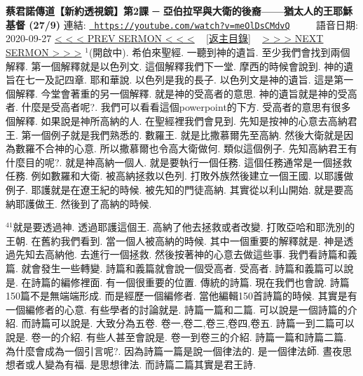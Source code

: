 \documentclass{book}
\begin{document}
\section{}
\label{sec:meOlDsCMdvQ}
\textbf{蔡君諾傳道【新約透視鏡】第2課 ─ 亞伯拉罕與大衛的後裔——猶太人的王耶穌基督 (27/9)}
\newline
\newline
連結: \href{https://youtube.com/watch?v=meOlDsCMdvQ}{\texttt{ https://youtube.com/watch?v=meOlDsCMdvQ}} ~~~~ 語音日期: 2020-09-27 
\newline
\newline
\hyperref[sec:6Yg3FVlhsxs]{\small{< < < PREV SERMON < < <}}
~
\hyperref[sec:index]{\small{[返主目錄]}}
~
\hyperref[sec:FpXj_b1Te98]{\small{> > > NEXT SERMON > > >}}
\newline
\newline
$^{1}$(開啟中).
希伯來聖經.
一聽到神的遺旨.
至少我們會找到兩個解釋.
第一個解釋就是以色列文.
這個解釋我們下一堂.
摩西的時候會說到.
神的遺旨在七一及記四章.
耶和華說.
以色列是我的長子.
以色列文是神的遺旨.
這是第一個解釋.
今堂會著重的另一個解釋.
就是神的受高者的意思.
神的遺旨就是神的受高者.
什麼是受高者呢?.
我們可以看看這個powerpoint的下方.
受高者的意思有很多個解釋.
如果說是神所高納的人.
在聖經裡我們會見到.
先知是按神的心意去高納君王.
第一個例子就是我們熟悉的.
數羅王.
就是比撒慕爾先至高納.
然後大衛就是因為數羅不合神的心意.
所以撒慕爾也令高大衛做何.
類似這個例子.
先知高納君王有什麼目的呢?.
就是神高納一個人.
就是要執行一個任務.
這個任務通常是一個拯救任務.
例如數羅和大衛.
被高納拯救以色列.
打敗外族然後建立一個王國.
以耶護做例子.
耶護就是在遼王紀的時候.
被先知的門徒高納.
其實從以利山開始.
就是要高納耶護做王.
然後到了高納的時候.

$^{41}$就是要透過神.
透過耶護這個王.
高納了他去拯救或者改變.
打敗亞哈和耶洗別的王朝.
在舊約我們看到.
當一個人被高納的時候.
其中一個重要的解釋就是.
神是透過先知去高納他.
去進行一個拯救.
然後按著神的心意去做這些事.
我們看詩篇和義篇.
就會發生一些轉變.
詩篇和義篇就會說一個受高者.
受高者.
詩篇和義篇可以說是.
在詩篇的編修裡面.
有一個很重要的位置.
傳統的詩篇.
現在我們也會說.
詩篇150篇不是無端端形成.
而是經歷一個編修者.
當他編輯150首詩篇的時候.
其實是有一個編修者的心意.
有些學者的討論就是.
詩篇一篇和二篇.
可以說是一個詩篇的介紹.
而詩篇可以說是.
大致分為五卷.
卷一,卷二,卷三,卷四,卷五.
詩篇一到二篇可以說是.
卷一的介紹.
有些人甚至會說是.
卷一到卷三的介紹.
詩篇一篇和詩篇二篇.
為什麼會成為一個引言呢?.
因為詩篇一篇是說一個律法的.
是一個律法師.
晝夜思想者或人變為有福.
是思想律法.
而詩篇二篇其實是君王詩.
\end{document}

